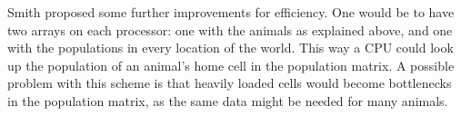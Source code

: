 Smith proposed some further improvements for efficiency. One would be
to have two arrays on each processor: one with
the animals as explained above, and one with the populations in every
location of the world. This way a CPU could look up the population
of an animal's home cell in the population matrix. A possible problem with
this scheme is that heavily loaded cells would become bottlenecks in
the population matrix, as the same data might be needed for many animals.


